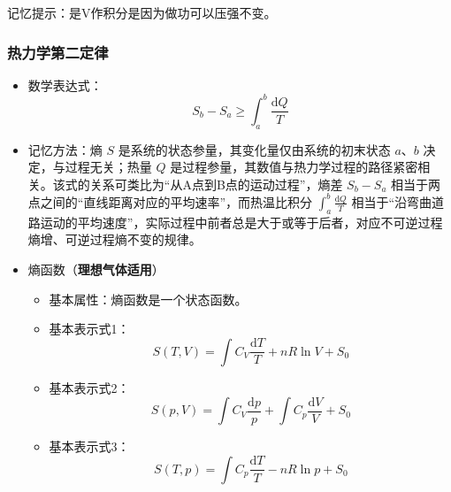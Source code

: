 \documentclass{article}
\begin{document}
	记忆提示：是V作积分是因为做功可以压强不变。
	
	\subsubsection{热力学第二定律}
	\begin{itemize}[leftmargin=2em]
		\item 数学表达式：
		\[
		S_b - S_a \ge \int_{a}^{b}\frac{\mathrm{d}Q}{T}
		\]
		\item 记忆方法：熵 $S$ 是系统的状态参量，其变化量仅由系统的初末状态 $a、b$ 决定，与过程无关；热量 $Q$ 是过程参量，其数值与热力学过程的路径紧密相关。该式的关系可类比为“从A点到B点的运动过程”，熵差 $S_b-S_a$ 相当于两点之间的“直线距离对应的平均速率”，而热温比积分 $\int_{a}^{b}\frac{\mathrm{d}Q}{T}$ 相当于“沿弯曲道路运动的平均速度”，实际过程中前者总是大于或等于后者，对应不可逆过程熵增、可逆过程熵不变的规律。
		\item 熵函数（\textbf{理想气体适用}）
		\begin{itemize}[leftmargin=2em]
			\item 基本属性：熵函数是一个状态函数。
			\item 基本表示式1：
			\[
			S(T,V)=\int C_V\frac{\mathrm{d}T}{T}+nR\ln V+S_0
			\]
			\item 基本表示式2：
			\[
			S(p,V)=\int C_V\frac{\mathrm{d}p}{p}+\int C_p\frac{\mathrm{d}V}{V}+S_0
			\]
			\item 基本表示式3：
			\[
			S(T,p)=\int C_p\frac{\mathrm{d}T}{T}-nR\ln p+S_0
			\]
		\end{itemize}
	\end{itemize}
	
	
\end{document}
